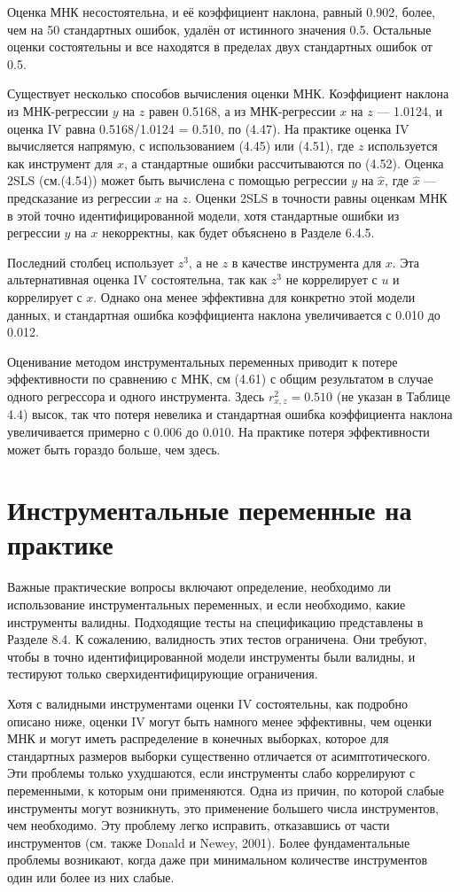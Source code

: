 Оценка МНК несостоятельна, и её коэффициент наклона, равный 0.902, более, чем на 50 стандартных ошибок, удалён от истинного значения 0.5. Остальные оценки состоятельны и все находятся в пределах двух стандартных ошибок от 0.5.

Существует несколько способов вычисления оценки МНК. Коэффициент наклона из МНК-регрессии $y$ на $z$ равен 0.5168, а из МНК-регрессии $x$ на $z$ --- 1.0124, и оценка IV равна 0.5168/1.0124 = 0.510, по (4.47). На практике оценка IV вычисляется напрямую, с использованием (4.45) или (4.51), где $z$ используется как инструмент для $x$, а стандартные ошибки рассчитываются по (4.52). Оценка 2SLS (см.(4.54)) может быть вычислена с помощью регрессии $y$ на $\hat{x}$, где $\hat{x}$ --- предсказание из регрессии $x$ на $z$. Оценки 2SLS в точности равны оценкам МНК в этой точно идентифицированной модели, хотя стандартные ошибки из регрессии $y$ на $x$ некорректны, как будет объяснено в Разделе 6.4.5.

Последний столбец использует $z^3$, а не $z$ в качестве инструмента для $x$. Эта альтернативная оценка IV состоятельна, так как $z^3$ не коррелирует с $u$ и коррелирует с $x$. Однако она менее эффективна для конкретно этой модели данных, и стандартная ошибка коэффициента наклона увеличивается с 0.010 до 0.012. 

Оценивание методом инструментальных переменных приводит к потере эффективности по сравнению с МНК, см (4.61) с общим результатом в случае одного регрессора и одного инструмента. Здесь $r^2_{x,z}=0.510$ (не указан в Таблице 4.4) высок, так что потеря невелика и 	стандартная ошибка коэффициента наклона увеличивается примерно с 0.006 до 0.010. На практике потеря эффективности может быть гораздо больше, чем здесь.


\section{Инструментальные переменные на практике}

Важные практические вопросы включают определение, необходимо ли использование инструментальных переменных, и если необходимо, какие инструменты валидны. Подходящие тесты на спецификацию представлены в Разделе 8.4. К сожалению, валидность этих тестов ограничена. Они требуют, чтобы в точно идентифицированной модели инструменты были валидны, и тестируют только сверхидентифицирующие ограничения.

Хотя с валидными инструментами оценки IV состоятельны, как подробно описано ниже, оценки IV могут быть намного менее эффективны, чем оценки МНК и могут иметь распределение в конечных выборках, которое для стандартных размеров выборки существенно отличается от асимптотического. Эти проблемы только ухудшаются,  если инструменты слабо коррелируют с переменными, к которым они применяются. Одна из причин, по которой слабые инструменты могут возникнуть, это применение большего числа инструментов, чем необходимо. Эту проблему легко исправить, отказавшись от части инструментов (см. также Donald и Newey, 2001). Более фундаментальные проблемы возникают, когда даже при минимальном количестве инструментов один или более из них слабые. 

